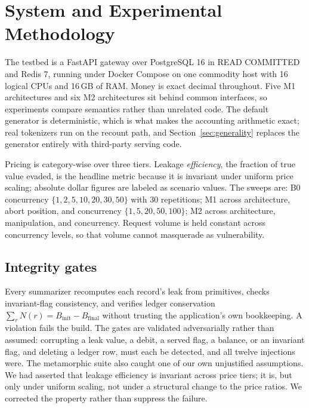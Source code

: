 \documentclass[preprint,3p,authoryear,12pt]{elsarticle}
\begin{document}
\section{System and Experimental Methodology}
\label{sec:method}
The testbed is a FastAPI gateway over PostgreSQL 16 in READ COMMITTED and Redis 7,
running under Docker Compose on one commodity host with 16 logical CPUs and 16\,GB of
RAM. Money is exact decimal throughout. Five M1 architectures and six M2 architectures
sit behind common interfaces, so experiments compare semantics rather than unrelated
code. The default generator is deterministic, which is what makes the accounting
arithmetic exact; real tokenizers run on the recount path, and
Section~\ref{sec:generality} replaces the generator entirely with third-party serving
code.

Pricing is category-wise over three tiers. Leakage \emph{efficiency}, the fraction of
true value evaded, is the headline metric because it is invariant under uniform price
scaling; absolute dollar figures are labeled as scenario values. The sweeps are: B0
concurrency $\{1,2,5,10,20,30,50\}$ with 30 repetitions; M1 across architecture, abort
position, and concurrency $\{1,5,20,50,100\}$; M2 across architecture, manipulation, and
concurrency. Request volume is held constant across concurrency levels, so that volume
cannot masquerade as vulnerability.

\subsection{Integrity gates}
Every summarizer recomputes each record's leak from primitives, checks invariant-flag
consistency, and verifies ledger conservation $\sum_r N(r) = B_{\mathrm{init}} -
B_{\mathrm{final}}$ without trusting the application's own bookkeeping. A violation fails
the build. The gates are validated adversarially rather than assumed: corrupting a leak
value, a debit, a served flag, a balance, or an invariant flag, and deleting a ledger row,
must each be detected, and all twelve injections were. The metamorphic suite also caught
one of our own unjustified assumptions. We had asserted that leakage efficiency is
invariant across price tiers; it is, but only under uniform scaling, not under a
structural change to the price ratios. We corrected the property rather than suppress the
failure.
\end{document}
